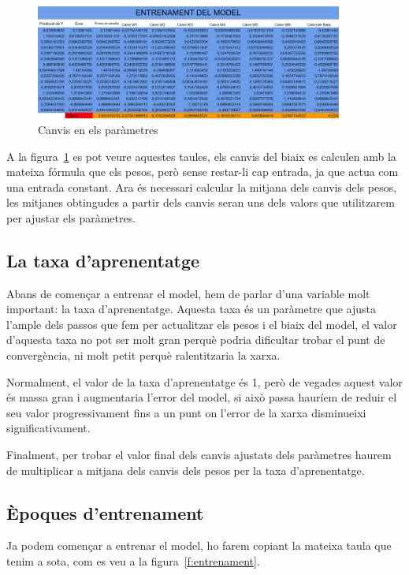 \begin{figure}[h!]
    \centering
    \includegraphics[width=0.9\textwidth]{./figures/Canvis.png}
    \caption{Canvis en els paràmetres}
    \label{f:canvisParametres}
\end{figure}

A la figura~\ref{f:canvisParametres} es pot veure aquestes taules, els canvis del biaix es calculen amb la mateixa fórmula que els pesos, però sense restar-li cap entrada, ja que actua com una entrada constant.
Ara és necessari calcular la mitjana dels canvis dels pesos, les mitjanes obtingudes a partir dels canvis seran uns dels valors que utilitzarem per ajustar els paràmetres.

\subsection{La taxa d'aprenentatge}
Abans de començar a entrenar el model, hem de parlar d'una variable molt important: la taxa d'aprenentatge. Aquesta taxa és un paràmetre que ajusta l'ample dels passos que fem per actualitzar els pesos i el biaix del model, el valor d'aquesta taxa no pot ser molt gran perquè podria dificultar trobar el punt de convergència, ni molt petit perquè ralentitzaria la xarxa.

Normalment, el valor de la taxa d'aprenentatge és 1, però de vegades aquest valor és massa gran i augmentaria l'error del model, si això passa hauríem de reduir el seu valor progressivament fins a un punt on l'error de la xarxa disminueixi significativament.

Finalment, per trobar el valor final dels canvis ajustats dels paràmetres haurem de multiplicar a mitjana dels canvis dels pesos per la taxa d'aprenentatge.

\subsection{Èpoques d'entrenament}
Ja podem començar a entrenar el model, ho farem copiant la mateixa taula que tenim a sota, com es veu a la figura~\ref{f:entrenament}.


